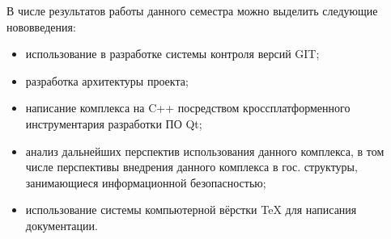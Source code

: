 В числе результатов работы данного семестра можно выделить следующие нововведения:

\begin{itemize}
\item использование в разработке системы контроля версий GIT;
\item разработка архитектуры проекта;
\item написание комплекса на C++ посредством кроссплатформенного инструментария разработки ПО Qt;
\item анализ дальнейших перспектив использования данного комплекса, в том числе перспективы внедрения данного комплекса в гос. структуры, занимающиеся информационной безопасностью;
\item использование системы компьютерной вёрстки TeX для написания документации.
\end{itemize}
